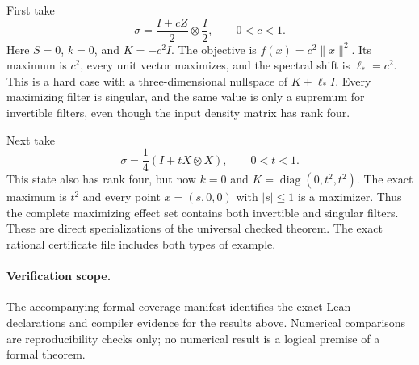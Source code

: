 First take
\[
 \sigma=\frac{I+cZ}{2}\otimes\frac I2,\qquad 0<c<1.
\]
Here $S=0$, $k=0$, and $K=-c^2I$. The objective is
$f(x)=c^2\|x\|^2$. Its maximum is $c^2$, every unit vector maximizes,
and the spectral shift is $\ell_*=c^2$. This is a hard case with a
three-dimensional nullspace of $K+\ell_*I$. Every maximizing filter is
singular, and the same value is only a supremum for invertible filters,
even though the input density matrix has rank four.

Next take
\[
 \sigma=\frac14(I+tX\otimes X),\qquad 0<t<1.
\]
This state also has rank four, but now $k=0$ and
$K=\operatorname{diag}(0,t^2,t^2)$. The exact maximum is $t^2$ and every
point $x=(s,0,0)$ with $|s|\leq1$ is a maximizer. Thus the complete
maximizing effect set contains both invertible and singular filters.
These are direct specializations of the universal checked theorem.
The exact rational certificate file includes both types of example.

\paragraph{Verification scope.}
The accompanying formal-coverage manifest identifies the exact Lean
declarations and compiler evidence for the results above.  Numerical
comparisons are reproducibility checks only; no numerical result is a
logical premise of a formal theorem.

